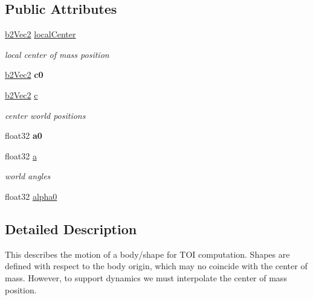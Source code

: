 \subsection*{Public Attributes}
\begin{DoxyCompactItemize}
\item 
\mbox{\label{structb2Sweep_a4bcc302cf78771896d6256fc53f2f8be}} 
\hyperlink{structb2Vec2}{b2\+Vec2} \hyperlink{structb2Sweep_a4bcc302cf78771896d6256fc53f2f8be}{local\+Center}
\begin{DoxyCompactList}\small\item\em local center of mass position \end{DoxyCompactList}\item 
\mbox{\label{structb2Sweep_a16dacd7188f3c7b2adef3242012587d8}} 
\hyperlink{structb2Vec2}{b2\+Vec2} {\bfseries c0}
\item 
\mbox{\label{structb2Sweep_a1b5402e01b92cc82473389fc6f0375c3}} 
\hyperlink{structb2Vec2}{b2\+Vec2} \hyperlink{structb2Sweep_a1b5402e01b92cc82473389fc6f0375c3}{c}
\begin{DoxyCompactList}\small\item\em center world positions \end{DoxyCompactList}\item 
\mbox{\label{structb2Sweep_acf89c7d1223f8ab27501ff033aeac92b}} 
float32 {\bfseries a0}
\item 
\mbox{\label{structb2Sweep_afa96bacc91dd3c92ae716a45512332d6}} 
float32 \hyperlink{structb2Sweep_afa96bacc91dd3c92ae716a45512332d6}{a}
\begin{DoxyCompactList}\small\item\em world angles \end{DoxyCompactList}\item 
float32 \hyperlink{structb2Sweep_aa5f8ab90178b58bc0777096cbc6b91cf}{alpha0}
\end{DoxyCompactItemize}


\subsection{Detailed Description}
This describes the motion of a body/shape for T\+OI computation. Shapes are defined with respect to the body origin, which may no coincide with the center of mass. However, to support dynamics we must interpolate the center of mass position. 

